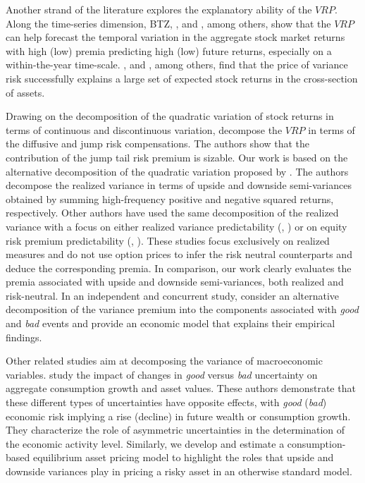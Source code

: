 \documentclass[11pt]{article}
\begin{document}
Another strand of the literature explores the explanatory ability of the $VRP$. Along the time-series dimension, BTZ, \cite{DrechslerYaron11RFS}, and \cite{KellyJiang14TailRisk}, among others, show that the $VRP$ can help forecast the temporal variation in the aggregate stock market returns with high (low) premia predicting high (low) future returns, especially on a within-the-year time-scale. \citet*{JOFI:JOFI836}, and \citet*{JOFI:JOFI12220}, among others, find that the price of variance risk successfully explains a large set of expected stock returns in the cross-section of assets.

Drawing on the decomposition of the quadratic variation of stock returns in terms of continuous and discontinuous variation, \cite{BollerTodorov11JF} decompose the $VRP$ in terms of the diffusive and jump risk compensations. The authors show that the contribution of the jump tail risk premium is sizable. Our work is based on the alternative decomposition of the quadratic variation proposed by \cite{BNKinnShep}. The authors decompose the realized variance in terms of upside and downside semi-variances obtained by summing high-frequency positive and negative squared returns, respectively. Other authors have used the same decomposition of the realized variance with a focus on either realized variance predictability (\citeauthor{PattonSheppard13REStat}, \citeyear{PattonSheppard13REStat}) or on equity risk premium predictability (\citeauthor{GuoWangZhou15GoodBadJump}, \citeyear{GuoWangZhou15GoodBadJump}). These studies focus exclusively on realized measures and do not use option prices to infer the risk neutral counterparts and deduce the corresponding premia. In comparison, our work clearly evaluates the premia associated with upside and downside semi-variances, both realized and risk-neutral. In an independent and concurrent study, \cite{KilicShaliastovich15} consider an alternative decomposition of the variance premium into the components associated with \emph{good} and \emph{bad} events and provide an economic model that explains their empirical findings.

Other related studies aim at decomposing the variance of macroeconomic variables. \cite{ShaliastovichYaronSegal14} study the impact of changes in \emph{good} versus \emph{bad} uncertainty on aggregate consumption growth and asset values. These authors demonstrate that these different types of uncertainties have opposite effects, with \emph{good} (\emph{bad}) economic risk implying a rise (decline) in future wealth or consumption growth. They characterize the role of asymmetric uncertainties in the determination of the economic activity level. Similarly, we develop and estimate a consumption-based equilibrium asset pricing model to highlight the roles that upside and downside variances play in pricing a risky asset in an otherwise standard model.
\end{document}
